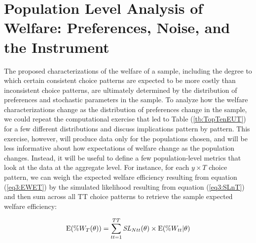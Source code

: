 \documentclass[../main.tex]{subfiles}
\begin{document}
%


\section{Population Level Analysis of Welfare: Preferences, Noise, and the Instrument}

The proposed characterizations of the welfare of a sample, including the degree to which certain consistent choice patterns are expected to be more costly than inconsistent choice patterns, are ultimately determined by the distribution of preferences and stochastic parameters in the sample.
To analyze how the welfare characterizations change as the distribution of preferences change in the sample, we could repeat the computational exercise that led to Table (\ref{tb:TopTenEUT}) for a few different distributions and discuss implications pattern by pattern.
This exercise, however, will produce data only for the populations chosen, and will be less informative about how expectations of welfare change as the population changes.
Instead, it will be useful to define a few population-level metrics that look at the data at the aggregate level.
For instance, for each $y \times T$ choice pattern, we can weigh the expected welfare efficiency resulting from equation (\ref{eq3:EWET}) by the simulated likelihood resulting from equation (\ref{eq3:SLnT}) and then sum across all TT choice patterns to retrieve the sample expected welfare efficiency:

\begin{equation}
	\label{eq3:EPWTT}
	\operatorname{E}(\%W_T(\theta)) = \sum_{tt=1}^{TT} \mathit{SL}_{Ntt}(\theta) \times \operatorname{E}(\%W_{tt} | \theta)
\end{equation}
\end{document}
